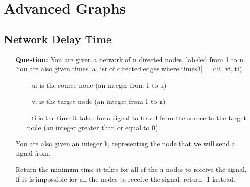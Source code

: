 \documentclass[12pt]{article}
\begin{document}
\section{Advanced Graphs}

\subsection{Network Delay Time}
\begin{enumerate}
  \item[] \textbf{Question:} You are given a network of n directed nodes, labeled from 1 to n. You are also given times, a list of directed edges where times[i] = (ui, vi, ti).

\begin{enumerate}
  \item[-] ui is the source node (an integer from 1 to n)
  \item[-] vi is the target node (an integer from 1 to n)
  \item[-] ti is the time it takes for a signal to travel from the source to the target node (an integer greater than or equal to 0).

\end{enumerate}
You are also given an integer k, representing the node that we will send a signal from.

Return the minimum time it takes for all of the n nodes to receive the signal. If it is impossible for all the nodes to receive the signal, return -1 instead.


\end{enumerate}
\end{document}
